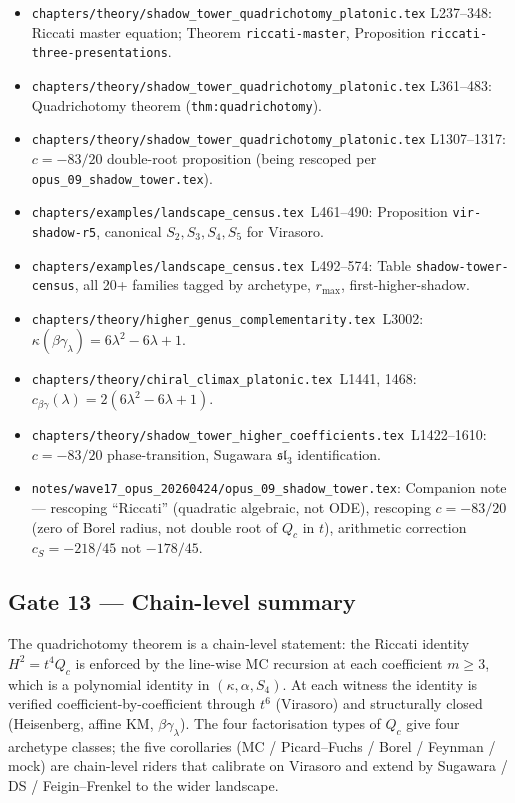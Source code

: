 \begin{itemize}
\item \texttt{chapters/theory/shadow\_tower\_quadrichotomy\_platonic.tex}
  L237--348: Riccati master equation; Theorem
  \texttt{riccati-master}, Proposition
  \texttt{riccati-three-presentations}.
\item \texttt{chapters/theory/shadow\_tower\_quadrichotomy\_platonic.tex}
  L361--483: Quadrichotomy theorem (\texttt{thm:quadrichotomy}).
\item \texttt{chapters/theory/shadow\_tower\_quadrichotomy\_platonic.tex}
  L1307--1317: $c = -83/20$ double-root proposition (being rescoped
  per \texttt{opus\_09\_shadow\_tower.tex}).
\item \texttt{chapters/examples/landscape\_census.tex}~L461--490:
  Proposition \texttt{vir-shadow-r5}, canonical $S_2, S_3, S_4,
  S_5$ for Virasoro.
\item \texttt{chapters/examples/landscape\_census.tex}~L492--574:
  Table \texttt{shadow-tower-census}, all 20+ families tagged by
  archetype, $r_{\max}$, first-higher-shadow.
\item \texttt{chapters/theory/higher\_genus\_complementarity.tex}~L3002:
  $\kappa(\beta\gamma_\lambda) = 6\lambda^2 - 6\lambda + 1$.
\item \texttt{chapters/theory/chiral\_climax\_platonic.tex}~L1441,
  1468: $c_{\beta\gamma}(\lambda) = 2(6\lambda^2 - 6\lambda + 1)$.
\item \texttt{chapters/theory/shadow\_tower\_higher\_coefficients.tex}~L1422--1610:
  $c = -83/20$ phase-transition, Sugawara $\mathfrak{sl}_3$
  identification.
\item \texttt{notes/wave17\_opus\_20260424/opus\_09\_shadow\_tower.tex}:
  Companion note --- rescoping ``Riccati'' (quadratic algebraic, not
  ODE), rescoping $c = -83/20$ (zero of Borel radius, not double
  root of $Q_c$ in $t$), arithmetic correction
  $c_S = -218/45$ not $-178/45$.
\end{itemize}

\subsection*{Gate 13 --- Chain-level summary}

The quadrichotomy theorem is a chain-level statement: the
Riccati identity $H^2 = t^4 Q_c$ is enforced by the line-wise MC
recursion at each coefficient $m \ge 3$, which is a polynomial
identity in $(\kappa, \alpha, S_4)$. At each witness the identity
is verified coefficient-by-coefficient through $t^6$ (Virasoro) and
structurally closed (Heisenberg, affine KM, $\beta\gamma_\lambda$).
The four factorisation types of $Q_c$ give four archetype classes;
the five corollaries (MC / Picard--Fuchs / Borel / Feynman / mock)
are chain-level riders that calibrate on Virasoro and extend by
Sugawara / DS / Feigin--Frenkel to the wider landscape.

